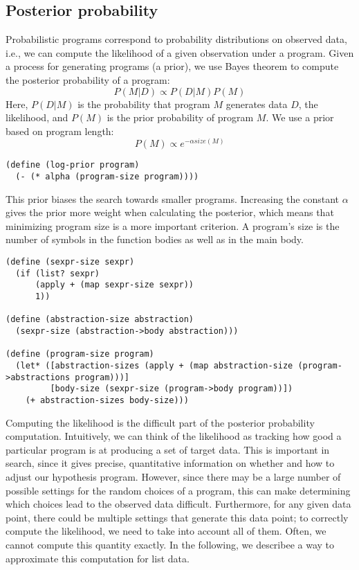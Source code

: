 \documentclass[a4paper,10pt]{article}
\begin{document}
\subsection{Posterior probability}

Probabilistic programs correspond to probability distributions on observed data, i.e., we can compute the likelihood of a given observation under a program. Given a process for generating programs (a prior), we use Bayes theorem to compute the posterior probability of a program:
\begin{equation}P(M|D)\propto P(D|M)P(M)\end{equation}
Here, $P(D|M)$ is the probability that program $M$ generates data $D$, the likelihood, and $P(M)$ is the prior probability of program $M$. We use a prior based on program length:
\begin{equation}P(M)\propto e^{-\alpha \mathit{size}(M)}\end{equation}
\begin{lstlisting}[frame=trbl]
(define (log-prior program)
  (- (* alpha (program-size program))))
\end{lstlisting}
This prior biases the search towards smaller programs. Increasing the constant $\alpha$ gives the prior more weight when calculating the posterior, which means that minimizing program size is a more important criterion. A program's size is the number of symbols in the function bodies as well as in the main body.
\begin{lstlisting}[frame=trbl]
(define (sexpr-size sexpr)
  (if (list? sexpr)
      (apply + (map sexpr-size sexpr))
      1))

(define (abstraction-size abstraction)
  (sexpr-size (abstraction->body abstraction)))
  
(define (program-size program)
  (let* ([abstraction-sizes (apply + (map abstraction-size (program->abstractions program)))]
         [body-size (sexpr-size (program->body program))])
    (+ abstraction-sizes body-size)))
\end{lstlisting}
Computing the likelihood is the difficult part of the posterior probability computation. Intuitively, we can think of the likelihood as tracking how good a particular program is at producing a set of target data.  This is important in search, since it gives precise, quantitative information on whether and how to adjust our hypothesis program. However, since there may be a large number of possible settings for the random choices of a program, this can make determining which choices lead to the observed data difficult. Furthermore, for any given data point, there could be multiple settings that generate this data point; to correctly compute the likelihood, we need to take into account all of them. Often, we cannot compute this quantity exactly. In the following, we describee a way to approximate this computation for list data.
\end{document}
